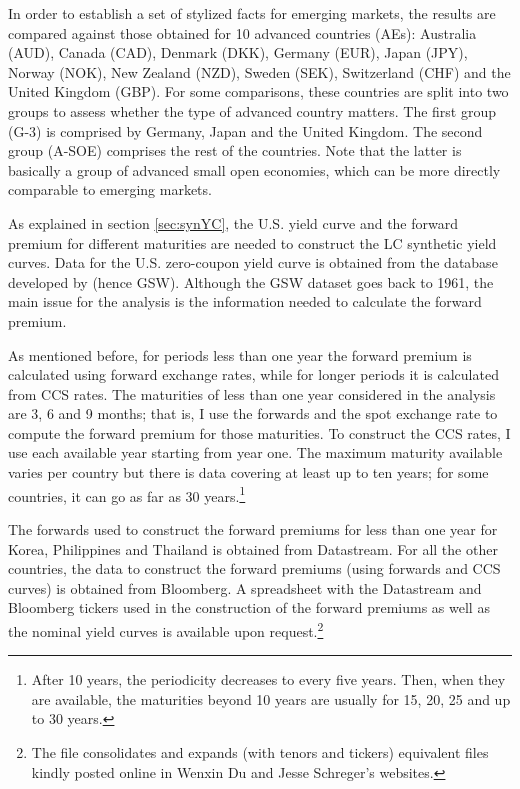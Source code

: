 In order to establish a set of stylized facts for emerging markets, the results are compared against those obtained for 10 advanced countries (AEs): Australia (AUD), Canada (CAD), Denmark (DKK), Germany (EUR), Japan (JPY), Norway (NOK), New Zealand (NZD), Sweden (SEK), Switzerland (CHF) and the United Kingdom (GBP). For some comparisons, these countries are split into two groups to assess whether the type of advanced country matters. The first group (G-3) is comprised by Germany, Japan and the United Kingdom. The second group (A-SOE) comprises the rest of the countries. Note that the latter is basically a group of advanced small open economies, which can be more directly comparable to emerging markets.

As explained in section \ref{sec:synYC}, the U.S. yield curve and the forward premium for different maturities are needed to construct the LC synthetic yield curves. Data for the U.S. zero-coupon yield curve is obtained from the database developed by \citet*{GSW:2007} (hence GSW). Although the GSW dataset goes back to 1961, the main issue for the analysis is the information needed to calculate the forward premium. 

As mentioned before, for periods less than one year the forward premium is calculated using forward exchange rates, while for longer periods it is calculated from CCS rates. The maturities of less than one year considered in the analysis are 3, 6 and 9 months; that is, I use the forwards and the spot exchange rate to compute the forward premium for those maturities. To construct the CCS rates, I use each available year starting from year one. The maximum maturity available varies per country but there is data covering at least up to ten years; for some countries, it can go as far as 30 years.\footnote{After 10 years, the periodicity decreases to every five years. Then, when they are available, the maturities beyond 10 years are usually for 15, 20, 25 and up to 30 years.} %

The forwards used to construct the forward premiums for less than one year for Korea, Philippines and Thailand is obtained from Datastream. For all the other countries, the data to construct the forward premiums (using forwards and CCS curves) is obtained from Bloomberg. A spreadsheet with the Datastream and Bloomberg tickers used in the construction of the forward premiums as well as the nominal yield curves is available upon request.\footnote{The file consolidates and expands (with tenors and tickers) equivalent files kindly posted online in Wenxin Du and Jesse Schreger's websites.}

